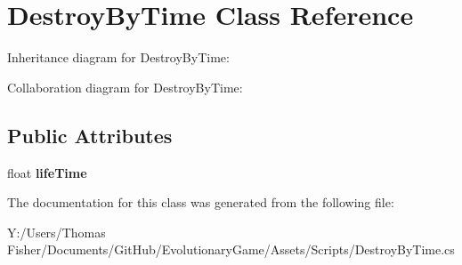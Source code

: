 \hypertarget{class_destroy_by_time}{}\section{Destroy\+By\+Time Class Reference}
\label{class_destroy_by_time}


Inheritance diagram for Destroy\+By\+Time\+:


Collaboration diagram for Destroy\+By\+Time\+:
\subsection*{Public Attributes}
\begin{DoxyCompactItemize}
\item 
\mbox{\label{class_destroy_by_time_a185bd89e592c3a5405ff469bcb0bc29c}} 
float {\bfseries life\+Time}
\end{DoxyCompactItemize}


The documentation for this class was generated from the following file\+:\begin{DoxyCompactItemize}
\item 
Y\+:/\+Users/\+Thomas Fisher/\+Documents/\+Git\+Hub/\+Evolutionary\+Game/\+Assets/\+Scripts/Destroy\+By\+Time.\+cs\end{DoxyCompactItemize}
